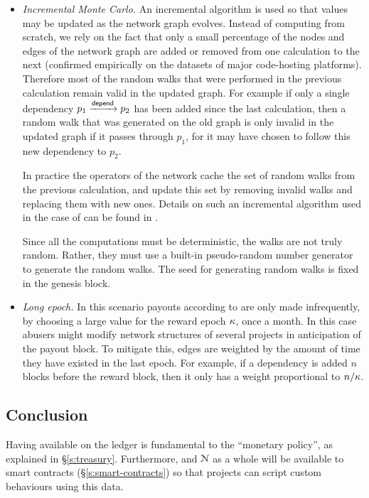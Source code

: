 \begin{itemize}
\item \emph{Incremental Monte Carlo.} An incremental algorithm is used so that
  \osrank{} values may be updated as the network graph evolves. Instead of
  computing \osrank{} from scratch, we rely on the fact that only a small
  percentage of the nodes and edges of the network graph are added or removed
  from one calculation to the next (confirmed empirically on the datasets of
  major code-hosting platforms). Therefore most of the random walks that were
  performed in the previous calculation remain valid in the updated graph. For
  example if only a single dependency $p_1 \xrightarrow[]{\mathsf{depend}} p_2$ has been
  added since the last calculation, then a random walk that was generated on the
  old graph is only invalid in the updated graph if it passes through $p_1$, for
  it may have chosen to follow this new dependency to $p_2$.

  In practice the operators of the network cache the set of random
  walks from the previous calculation, and update this set by removing
  invalid walks and replacing them with new ones. Details on such an
  incremental algorithm used in the case of \pagerank{} can be found
  in \cite{incr pagerank}.

  Since all the computations must be deterministic, the walks are not
  truly random. Rather, they must use a built-in pseudo-random number
  generator to generate the random walks. The seed for generating
  random walks is fixed in the genesis block.


\item \emph{Long epoch.} In this scenario payouts according to
  \osrank{} are only made infrequently, by choosing a large value for the
  reward epoch $\kappa$, \eg once a month.  In this case
  abusers might modify network structures of several projects in
  anticipation of the payout block. To mitigate this, edges are
  weighted by the amount of time they have existed in the last epoch. For
  example, if a dependency is added $n$ blocks before the reward block,
  then it only has a weight proportional to $n/\kappa$.
\end{itemize}

\subsection{Conclusion}

Having \osrank{} available on the ledger is fundamental to the \oscoin{}
``monetary policy'', as explained in \S \ref{s:treasury}. Furthermore,
\osrank{} and $\mathcal{N}$ as a whole will be available to smart contracts
(\S\ref{s:smart-contracts}) so that projects can script custom behaviours using
this data.
